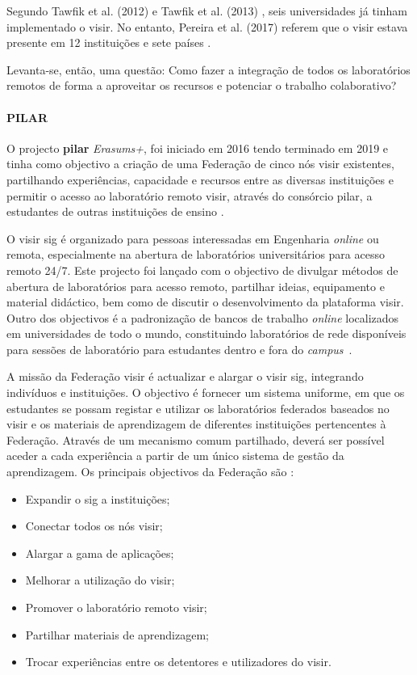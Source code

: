 Segundo Tawfik et al. (2012) \cite{tawfikexperiences} e Tawfik et al. (2013) \cite{tawfikvisir}, seis universidades já tinham implementado o \acrshort{visir}. No entanto, Pereira et al. (2017) referem que o \acrshort{visir} estava presente em 12 instituições e sete países \cite{pereira}.

Levanta-se, então, uma questão: Como fazer a integração de todos os laboratórios remotos de forma a aproveitar os recursos e potenciar o trabalho colaborativo?

\paragraph{PILAR}
O projecto \textbf{\acrfull{pilar}} \textit{Erasums+}, foi iniciado em 2016 tendo terminado em 2019 e tinha como objectivo a criação de uma Federação de cinco nós \acrshort{visir} existentes, partilhando experiências, capacidade e recursos entre as diversas instituições e permitir o acesso ao laboratório remoto \acrshort{visir}, através do consórcio \acrshort{pilar}, a estudantes de outras instituições de ensino \cite{garcia-loro}.

O \acrshort{visir} \acrfull{sig} é organizado para pessoas interessadas em Engenharia \textit{online} ou remota, especialmente na abertura de laboratórios universitários para acesso remoto 24/7. Este projecto foi lançado com o objectivo de divulgar métodos de abertura de laboratórios para acesso remoto,  partilhar ideias, equipamento e material didáctico, bem como de discutir o desenvolvimento da plataforma \acrshort{visir}. Outro dos objectivos é a padronização de bancos de trabalho \textit{online} localizados em universidades de todo o mundo, constituindo laboratórios de rede disponíveis para sessões de laboratório para estudantes dentro e fora do \textit{campus}~\cite{visirsig}.

A missão da Federação \acrshort{visir} é actualizar e alargar o \acrshort{visir} \acrshort{sig}, integrando indivíduos e instituições. O objectivo é fornecer um sistema uniforme, em que os estudantes se possam registar e utilizar os laboratórios federados baseados no \acrshort{visir} e os materiais de aprendizagem de diferentes instituições pertencentes à Federação. Através de um mecanismo comum partilhado, deverá ser possível aceder a cada experiência a partir de um único sistema de gestão da aprendizagem. Os principais objectivos da Federação são \cite{visirfederation}:
\begin{itemize}
    \item Expandir o \acrshort{sig} a instituições;
    \item Conectar todos os nós \acrshort{visir};
    \item Alargar a gama de aplicações;
    \item Melhorar a utilização do \acrshort{visir};
    \item Promover o laboratório remoto \acrshort{visir};
    \item Partilhar materiais de aprendizagem;
    \item Trocar experiências entre os detentores e utilizadores do \acrshort{visir}.
\end{itemize}

